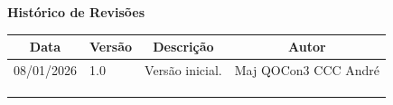 \begin{table}[h]
	\begin{center}
	    \textbf{\Huge{Histórico de Revisões}}
	\end{center}
    \centering
	\begin{tabular}{|p{3cm}|p{1.5cm}|p{7.5cm}|p{3.2cm}|}
		\hline \multicolumn{1}{|c|}{\textbf{Data}} & \multicolumn{1}{|c|}{\textbf{Versão}} &
			\multicolumn{1}{|c|}{\textbf{Descrição}} & \multicolumn{1}{|c|}{\textbf{Autor}} \\ \hline
		08/01/2026 & 1.0 & Versão inicial. & Maj QOCon3 CCC André \\ \hline
		& & & \\ \hline
		& & & \\ \hline
		& & & \\ \hline
	\end{tabular}
\end{table}